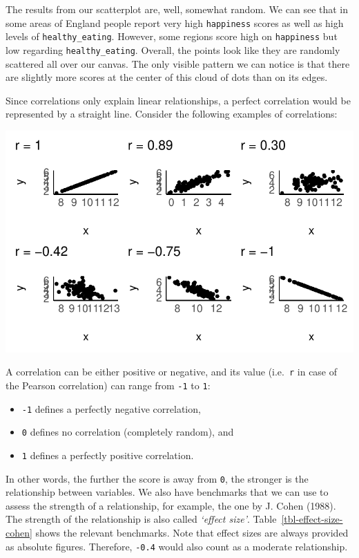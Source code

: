 \documentclass[
  letterpaper,
]{krantz}
\begin{document}
The results from our scatterplot are, well, somewhat random. We can see
that in some areas of England people report very high \texttt{happiness}
scores as well as high levels of \texttt{healthy\_eating}. However, some
regions score high on \texttt{happiness} but low regarding
\texttt{healthy\_eating}. Overall, the points look like they are
randomly scattered all over our canvas. The only visible pattern we can
notice is that there are slightly more scores at the center of this
cloud of dots than on its edges.

Since correlations only explain linear relationships, a perfect
correlation would be represented by a straight line. Consider the
following examples of correlations:

\includegraphics{10_correlations_files/figure-pdf/correlation-examples-1.pdf}

A correlation can be either positive or negative, and its value
(i.e.~\texttt{r} in case of the Pearson correlation) can range from
\texttt{-1} to \texttt{1}:

\begin{itemize}
\item
  \texttt{-1} defines a perfectly negative correlation,
\item
  \texttt{0} defines no correlation (completely random), and
\item
  \texttt{1} defines a perfectly positive correlation.
\end{itemize}

In other words, the further the score is away from \texttt{0}, the
stronger is the relationship between variables. We also have benchmarks
that we can use to assess the strength of a relationship, for example,
the one by J. Cohen (1988). The strength of the relationship is also
called \emph{`effect size'}. Table~\ref{tbl-effect-size-cohen} shows the
relevant benchmarks. Note that effect sizes are always provided as
absolute figures. Therefore, \texttt{-0.4} would also count as a
moderate relationship.
\end{document}
